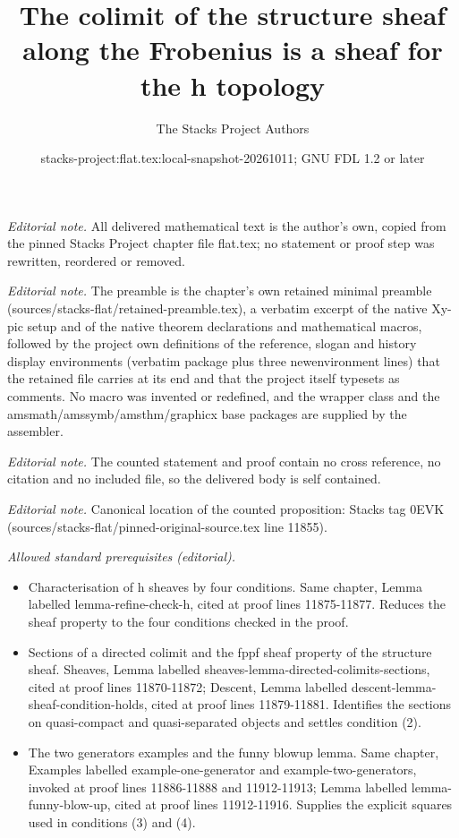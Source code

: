 \documentclass[10pt,a4paper]{amsart}
\title{The colimit of the structure sheaf along the Frobenius is a sheaf for the h topology}
\author{The Stacks Project Authors}
\date{stacks-project:flat.tex:local-snapshot-20261011; GNU FDL 1.2 or later}
\theoremstyle{plain}
\theoremstyle{definition}
\theoremstyle{remark}
\numberwithin{equation}{subsection}
\begin{document}
\maketitle
\noindent\textit{Editorial note.} All delivered mathematical text is the author's own, copied from the pinned Stacks Project chapter file flat.tex; no statement or proof step was rewritten, reordered or removed.\par\medskip
\noindent\textit{Editorial note.} The preamble is the chapter's own retained minimal preamble (sources/stacks-flat/retained-preamble.tex), a verbatim excerpt of the native Xy-pic setup and of the native theorem declarations and mathematical macros, followed by the project own definitions of the reference, slogan and history display environments (verbatim package plus three newenvironment lines) that the retained file carries at its end and that the project itself typesets as comments. No macro was invented or redefined, and the wrapper class and the amsmath/amssymb/amsthm/graphicx base packages are supplied by the assembler.\par\medskip
\noindent\textit{Editorial note.} The counted statement and proof contain no cross reference, no citation and no included file, so the delivered body is self contained.\par\medskip
\noindent\textit{Editorial note.} Canonical location of the counted proposition: Stacks tag 0EVK (sources/stacks-flat/pinned-original-source.tex line 11855).\par\medskip
\noindent\textit{Allowed standard prerequisites (editorial).}\begin{itemize}
\item Characterisation of h sheaves by four conditions. Same chapter, Lemma labelled lemma-refine-check-h, cited at proof lines 11875-11877. Reduces the sheaf property to the four conditions checked in the proof.
\item Sections of a directed colimit and the fppf sheaf property of the structure sheaf. Sheaves, Lemma labelled sheaves-lemma-directed-colimits-sections, cited at proof lines 11870-11872; Descent, Lemma labelled descent-lemma-sheaf-condition-holds, cited at proof lines 11879-11881. Identifies the sections on quasi-compact and quasi-separated objects and settles condition (2).
\item The two generators examples and the funny blowup lemma. Same chapter, Examples labelled example-one-generator and example-two-generators, invoked at proof lines 11886-11888 and 11912-11913; Lemma labelled lemma-funny-blow-up, cited at proof lines 11912-11916. Supplies the explicit squares used in conditions (3) and (4).
\end{itemize}\medskip
\end{document}
